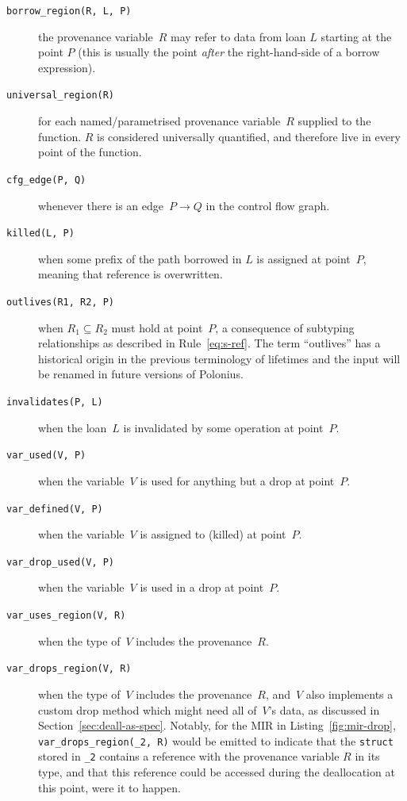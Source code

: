 \documentclass[11pt,a4paper,twoside,openany,draft]{report}
\newcommand{\InRust}[1]{\texttt{#1}}
\newcommand{\InDatalog}[1]{\texttt{#1}}
\begin{document}
\begin{description}
\item[\InDatalog{borrow_region(R, L, P)}] the provenance variable~$R$ may refer
  to data from loan $L$ starting at the point $P$ (this is usually the point
  \emph{after} the right-hand-side of a borrow expression).
  
\item[\InDatalog{universal_region(R)}] for each named/parametrised provenance
  variable~$R$ supplied to the function. $R$ is considered universally
  quantified, and therefore live in every point of the function.
  
\item[\InDatalog{cfg_edge(P, Q)}] whenever there is an edge~$P \rightarrow Q$ in
  the control flow graph.
    
\item[\InDatalog{killed(L, P)}] when some prefix of the path borrowed in $L$ is
  assigned at point~$P$, meaning that reference is overwritten.
    
\item[\InDatalog{outlives(R1, R2, P)}] when $R_1 \subseteq R_2$ must hold at
  point~$P$, a consequence of subtyping relationships as described in
  Rule~\eqref{eq:s-ref}. The term ``outlives'' has a historical origin in the
  previous terminology of lifetimes and the input will be renamed in future
  versions of Polonius.
    
\item[\InDatalog{invalidates(P, L)}] when the loan~$L$ is invalidated by some
  operation at point~$P$.
    
\item[\InDatalog{var_used(V, P)}] when the variable~$V$ is used for anything but
  a drop at point~$P$.
    
\item[\InDatalog{var_defined(V, P)}] when the variable~$V$ is assigned to
  (killed) at point~$P$.
  
\item[\InDatalog{var_drop_used(V, P)}] when the variable~$V$ is used in a drop
  at point~$P$.

\item[\InDatalog{var_uses_region(V, R)}] when the type of~$V$ includes the
  provenance~$R$.

\item[\InDatalog{var_drops_region(V, R)}] when the type of~$V$ includes the
  provenance~$R$, and~$V$ also implements a custom drop method which might need
  all of~$V$'s data, as discussed in Section~\ref{sec:deall-as-spec}. Notably,
  for the MIR in Listing~\ref{fig:mir-drop}, \InDatalog{var_drops_region(_2, R)}
  would be emitted to indicate that the \InRust{struct} stored in \InRust{_2}
  contains a reference with the provenance variable $R$ in its type, and that
  this reference could be accessed during the deallocation at this point, were
  it to happen.


\end{description}
\end{document}
